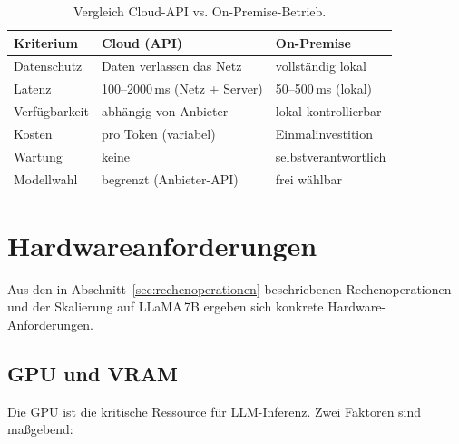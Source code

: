 \begin{table}[H]
    \centering
    \small
    \begin{tabular}{l p{4.5cm} p{4.5cm}}
        \toprule
        Kriterium & Cloud (API) & On-Premise \\
        \midrule
        Datenschutz    & Daten verlassen das Netz & vollständig lokal \\
        Latenz         & 100--2000\,ms (Netz + Server) & 50--500\,ms (lokal) \\
        Verfügbarkeit  & abhängig von Anbieter & lokal kontrollierbar \\
        Kosten         & pro Token (variabel) & Einmalinvestition \\
        Wartung        & keine & selbstverantwortlich \\
        Modellwahl     & begrenzt (Anbieter-API) & frei wählbar \\
        \bottomrule
    \end{tabular}
    \caption{Vergleich Cloud-API vs. On-Premise-Betrieb.}
    \label{tab:cloud_vs_onpremise}
\end{table}

\section{Hardwareanforderungen}
\label{sec:hardware}

Aus den in Abschnitt~\ref{sec:rechenoperationen} beschriebenen
Rechenoperationen und der Skalierung auf LLaMA\,7B ergeben sich
konkrete Hardware-Anforderungen.

\subsection{GPU und VRAM}

Die GPU ist die kritische Ressource für LLM-Inferenz. Zwei Faktoren
sind maßgebend:


